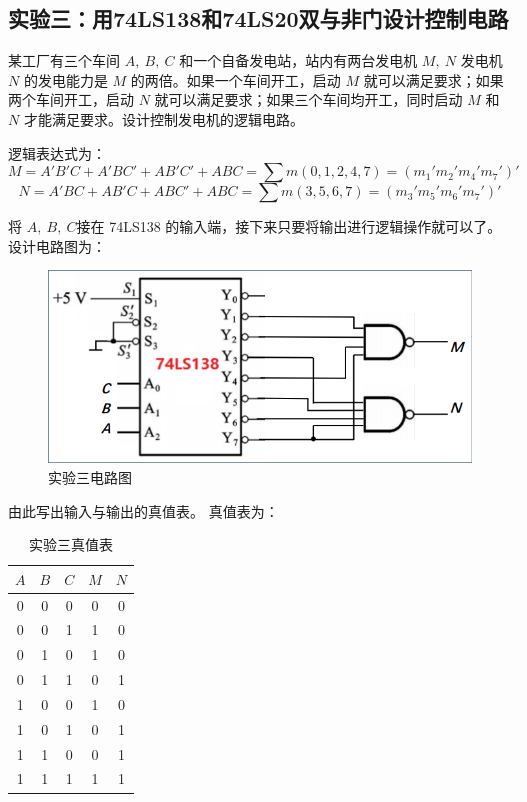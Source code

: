 \documentclass[a4paper,11pt,UTF8]{ctexart}
\begin{document}
\subsection{实验三：用74LS138和74LS20双与非门设计控制电路}
	\par {\kaishu 某工厂有三个车间 $A,~B,~C$ 和一个自备发电站，站内有两台发电机 $M,~N$ 发电机 $N$ 的发电能力是 $M$ 的两倍。如果一个车间开工，启动 $M$ 就可以满足要求；如果两个车间开工，启动 $N$ 就可以满足要求；如果三个车间均开工，同时启动 $M$ 和 $N$ 才能满足要求。设计控制发电机的逻辑电路。
	}
	\par 逻辑表达式为：
	\[ M=A'B'C+A'BC'+AB'C'+ABC=\sum m(0,1,2,4,7)
	=(m_1'm_2'm_4'm_7')'\]
	\[ N=A'BC+AB'C+ABC'+ABC=\sum m(3,5,6,7)
	=(m_3'm_5'm_6'm_7')'\]
	\par 将 $A,~B,~C$接在 74LS138 的输入端，接下来只要将输出进行逻辑操作就可以了。设计电路图为：
	\begin{figure}[H]
	 \centering
	 \includegraphics[width=0.5\linewidth]{Exp03}
	 \caption{实验三电路图}
	 \label{fig:exp03}
	\end{figure}
	\par 由此写出输入与输出的真值表。
	真值表为：
	\begin{table}[H]
	 \centering
	 \begin{tabular}{|ccc|cc|}\hline
	  $A$&$B$&$C$ &$M$&$N$
	  \\\hline
	  0&0&0 &0&0
	  \\\hline
	  0&0&1 &1&0
	  \\\hline
	  0&1&0 &1&0
	  \\\hline
	  0&1&1 &0&1
	  \\\hline
	  1&0&0 &1&0
	  \\\hline
	  1&0&1 &0&1
	  \\\hline
	  1&1&0 &0&1
	  \\\hline
	  1&1&1 &1&1
	  \\\hline
	 \end{tabular}
	 \caption{实验三真值表}
	\end{table}
\end{document}
